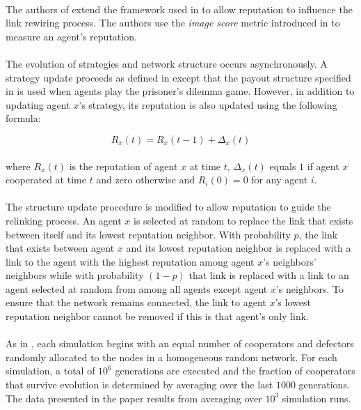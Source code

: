 \documentclass{article}
\begin{document}
	\paragraph{}The authors of \cite{Fu2008} extend the framework used in \cite{Santos2006d} to allow reputation to influence the link rewiring process.  The authors use the \textit{image score} metric introduced in \cite{Nowak1998} to measure an agent's reputation.
	\paragraph{}The evolution of strategies and network structure occurs asynchronously.  A strategy update proceeds as defined in \cite{Santos2006d} except that the payout structure specified in \cite{Nowak1992} is used when agents play the prisoner's dilemma game.  However, in addition to updating agent $x$'s strategy, its reputation is also updated using the following formula:
	
	\begin{equation}
	R_x(t)=R_x(t-1)+\Delta_x(t)
	\end{equation}

	\paragraph{}where $R_x(t)$ is the reputation of agent $x$ at time $t$, $\Delta_x(t)$ equals $1$ if agent $x$ cooperated at time $t$ and zero otherwise and $R_i(0)=0$ for any agent $i$.
	\paragraph{}The structure update procedure is modified to allow reputation to guide the relinking process.  An agent $x$ is selected at random to replace the link that exists between itself and its lowest reputation neighbor.  With probability $p$, the link that exists between agent $x$ and its lowest reputation neighbor is replaced with a link to the agent with the highest reputation among agent $x$'s neighbors' neighbors while with probability $(1-p)$ that link is replaced with a link to an agent selected at random from among all agents except agent $x$'s neighbors.  To ensure that the network remains connected, the link to agent $x$'s lowest reputation neighbor cannot be removed if this is that agent's only link.
	\paragraph{}As in \cite{Santos2006d}, each simulation begins with an equal number of cooperators and defectors randomly allocated to the nodes in a homogeneous random network.  For each simulation, a total of $10^6$ generations are executed and the fraction of cooperators that survive evolution is determined by averaging over the last $1000$ generations.  The data presented in the paper results from averaging over $10^3$ simulation runs.
\end{document}
